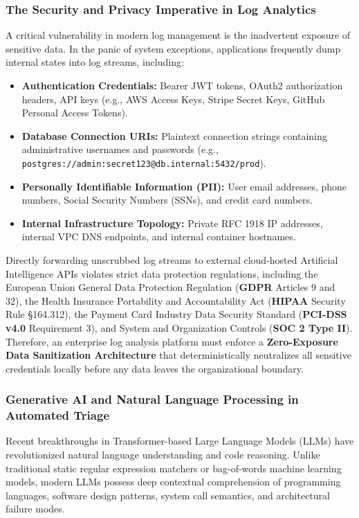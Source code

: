 \documentclass[12pt,a4paper]{article}
\begin{document}
\subsubsection{The Security and Privacy Imperative in Log Analytics}
A critical vulnerability in modern log management is the inadvertent exposure of sensitive data. In the panic of system exceptions, applications frequently dump internal states into log streams, including:
\begin{itemize}[leftmargin=1.2em]
    \item \textbf{Authentication Credentials:} Bearer JWT tokens, OAuth2 authorization headers, API keys (e.g., AWS Access Keys, Stripe Secret Keys, GitHub Personal Access Tokens).
    \item \textbf{Database Connection URIs:} Plaintext connection strings containing administrative usernames and passwords (e.g., \texttt{postgres://admin:secret123@db.internal:5432/prod}).
    \item \textbf{Personally Identifiable Information (PII):} User email addresses, phone numbers, Social Security Numbers (SSNs), and credit card numbers.
    \item \textbf{Internal Infrastructure Topology:} Private RFC 1918 IP addresses, internal VPC DNS endpoints, and internal container hostnames.
\end{itemize}

Directly forwarding unscrubbed log streams to external cloud-hosted Artificial Intelligence APIs violates strict data protection regulations, including the European Union General Data Protection Regulation (\textbf{GDPR} Articles 9 and 32), the Health Insurance Portability and Accountability Act (\textbf{HIPAA} Security Rule \S 164.312), the Payment Card Industry Data Security Standard (\textbf{PCI-DSS v4.0} Requirement 3), and System and Organization Controls (\textbf{SOC 2 Type II}). Therefore, an enterprise log analysis platform must enforce a \textbf{Zero-Exposure Data Sanitization Architecture} that deterministically neutralizes all sensitive credentials locally before any data leaves the organizational boundary.

\subsubsection{Generative AI and Natural Language Processing in Automated Triage}
Recent breakthroughs in Transformer-based Large Language Models (LLMs) have revolutionized natural language understanding and code reasoning. Unlike traditional static regular expression matchers or bag-of-words machine learning models, modern LLMs possess deep contextual comprehension of programming languages, software design patterns, system call semantics, and architectural failure modes.
\end{document}
